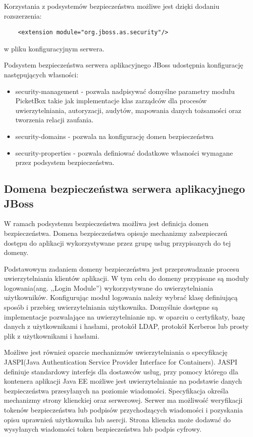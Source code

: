 		Korzystania z podsystemów bezpieczeństwa możliwe jest dzięki dodaniu rozszerzenia:
		\lstset{language=XML}
		\begin{lstlisting}
	<extension module="org.jboss.as.security"/>
		\end{lstlisting}
		w pliku konfiguracyjnym serwera.

		Podsystem bezpieczeństwa serwera aplikacyjnego JBoss udostępnia konfigurację następujących własności:

		\begin{itemize}
			\item security-management - pozwala nadpisywać domyślne parametry modułu PicketBox takie jak implementacje klas zarządców dla procesów uwierzytelniania, autoryzacji, audytów, mapowania danych tożsamości oraz tworzenia relacji zaufania.
			\item security-domains - pozwala na konfigurację domen bezpieczeństwa
			\item security-properties - pozwala definiować dodatkowe własności wymagane przez podsystem bezpieczeństwa.
		\end{itemize}

	\subsection{Domena bezpieczeństwa serwera aplikacyjnego JBoss}

		W ramach podsystemu bezpieczeństwa możliwa jest definicja domen bezpieczeństwa. Domena bezpieczeństwa opisuje mechanizmy zabezpieczeń dostępu do aplikacji wykorzystywane przez grupę usług przypisanych do tej domeny.

		Podstawowym zadaniem domeny bezpieczeństwa jest przeprowadzanie procesu uwierzytelniania klientów aplikacji. W tym celu do domeny przypisane są moduły logowania(ang. ,,Login Module'') wykorzystywane do uwierzytelniania użytkowników. Konfigurując moduł logowania należy wybrać klasę definiującą sposób i przebieg uwierzytelniania użytkownika. Domyślnie dostępne są implementacje pozwalające na uwierzytelnianie np. w oparciu o certyfikaty, bazę danych z użytkownikami i hasłami, protokół LDAP, protokół Kerberos lub prosty plik z użytkownikami i hasłami.

		Możliwe jest również oparcie mechanizmów uwierzytelniania o specyfikację JASPI(Java Authentication Service Provider Interface for Containers). JASPI definiuje standardowy interfejs dla dostawców usług, przy pomocy którego dla kontenera aplikacji Java EE możliwe jest uwierzytelnianie na podstawie danych bezpieczeństwa przesyłanych na poziomie wiadomości. Specyfikacja określa mechanizmy strony klienckiej oraz serwerowej. Serwer ma możliwość weryfikacji tokenów bezpieczeństwa lub podpisów przychodzących wiadomości i pozyskania opisu uprawnień użytkownika lub asercji. Strona kliencka może dodawać do wysyłanych wiadomości token bezpieczeństwa lub podpis cyfrowy. 

